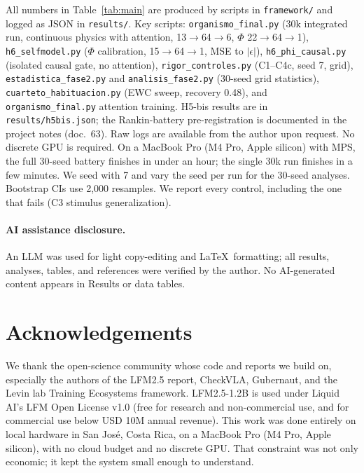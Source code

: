 \documentclass[11pt,a4paper]{article}
\begin{document}
All numbers in Table~\ref{tab:main} are produced by scripts in \texttt{framework/} and logged as JSON in \texttt{results/}. Key scripts: \texttt{organismo\_final.py} (30k integrated run, continuous physics with attention, 13$\rightarrow$64$\rightarrow$6, $\Phi$ 22$\rightarrow$64$\rightarrow$1), \texttt{h6\_selfmodel.py} ($\Phi$ calibration, 15$\rightarrow$64$\rightarrow$1, MSE to $|\epsilon|$), \texttt{h6\_phi\_causal.py} (isolated causal gate, no attention), \texttt{rigor\_controles.py} (C1--C4c, seed 7, grid), \texttt{estadistica\_fase2.py} and \texttt{analisis\_fase2.py} (30-seed grid statistics), \texttt{cuarteto\_habituacion.py} (EWC sweep, recovery 0.48), and \texttt{organismo\_final.py} attention training. H5-bis results are in \texttt{results/h5bis.json}; the Rankin-battery pre-registration is documented in the project notes (doc.~63). Raw logs are available from the author upon request. No discrete GPU is required. On a MacBook Pro (M4 Pro, Apple silicon) with MPS, the full 30-seed battery finishes in under an hour; the single 30k run finishes in a few minutes. We seed with 7 and vary the seed per run for the 30-seed analyses. Bootstrap CIs use 2,000 resamples. We report every control, including the one that fails (C3 stimulus generalization).

\paragraph{AI assistance disclosure.} An LLM was used for light copy-editing and \LaTeX\ formatting; all results, analyses, tables, and references were verified by the author. No AI-generated content appears in Results or data tables.

\section{Acknowledgements}

We thank the open-science community whose code and reports we build on, especially the authors of the LFM2.5 report, CheckVLA, Gubernaut, and the Levin lab Training Ecosystems framework. LFM2.5-1.2B is used under Liquid AI's LFM Open License v1.0 (free for research and non-commercial use, and for commercial use below USD 10M annual revenue). This work was done entirely on local hardware in San Jos\'e, Costa Rica, on a MacBook Pro (M4 Pro, Apple silicon), with no cloud budget and no discrete GPU. That constraint was not only economic; it kept the system small enough to understand.
\end{document}
